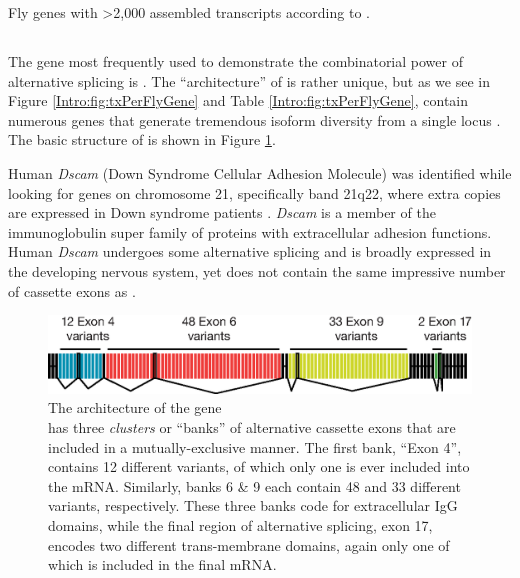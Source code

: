     \begin{table} %
      \caption{Fly genes with >2,000 assembled transcripts according to \citep{Brown2014}.}
      \label{Intro:tab:FlyGenesWithManyTx}
      
      \end{table}

  \subsection{\flies{} \dscam{}}
    \label{Intro:subsec:Dscam}

    The gene most frequently used to demonstrate the combinatorial power of alternative splicing is \flies{} \dscam{}. The ``architecture'' of \dscam{} is rather unique, but as we see in Figure \ref{Intro:fig:txPerFlyGene} and Table \ref{Intro:fig:txPerFlyGene}, \flies{} contain numerous genes that generate tremendous isoform diversity from a single locus \citep{Brown2014}. The basic structure of \dscam{} is shown in Figure \ref{Intro:fig:DscamArch}.

    Human \textit{Dscam} (Down Syndrome Cellular Adhesion Molecule) was identified while looking for genes on chromosome 21, specifically band 21q22, where extra copies are expressed in Down syndrome patients \citep{Yamakawa1998a}. \textit{Dscam} is a member of the immunoglobulin super family of proteins with extracellular adhesion functions. Human \textit{Dscam} undergoes some alternative splicing and is broadly expressed in the developing nervous system, yet does not contain the same impressive number of cassette exons as \flies{} \dscam{}.

    \begin{figure} %
      \centering 
      \includegraphics{Figures/Intro/DscamArch.eps}
      \caption[The architecture of the \flies{} gene \dscam{}]
      {
        The architecture of the \flies{} gene \dscam{}\\[0.25cm]
        \dscam{} has three \textit{clusters} or ``banks'' of alternative cassette exons that are included in a mutually-exclusive manner. The first bank, ``Exon 4'', contains 12 different variants, of which only one is ever included into the mRNA. Similarly, banks 6 \& 9 each contain 48 and 33 different variants, respectively. These three banks code for extracellular IgG domains, while the final region of alternative splicing, exon 17, encodes two different trans-membrane domains, again only one of which is included in the final mRNA.
          }
        \label{Intro:fig:DscamArch}
        \end{figure}

